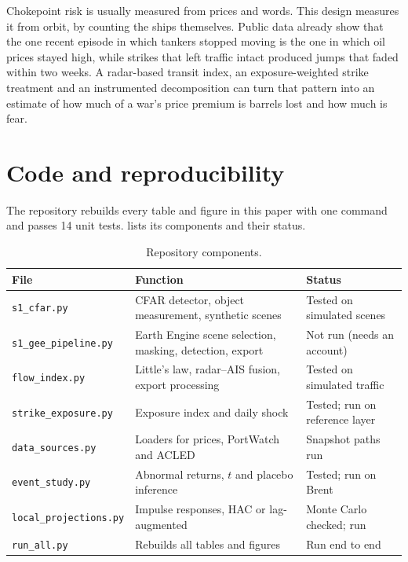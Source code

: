\documentclass{article}
\begin{document}
Chokepoint risk is usually measured from prices and words. This design measures it from orbit, by counting the ships themselves. Public data already show that the one recent episode in which tankers stopped moving is the one in which oil prices stayed high, while strikes that left traffic intact produced jumps that faded within two weeks. A radar-based transit index, an exposure-weighted strike treatment and an instrumented decomposition can turn that pattern into an estimate of how much of a war's price premium is barrels lost and how much is fear.

\FloatBarrier



\appendix
\section{Code and reproducibility}
\label{app:code}

The repository rebuilds every table and figure in this paper with one command and passes 14 unit tests.  lists its components and their status.

\begin{table}[h]
\centering
\small
\caption{Repository components.}
\label{tab:code}
\begin{tabularx}{\textwidth}{@{}L{4.1cm}YL{4.1cm}@{}}
\toprule
File & Function & Status \\
\midrule
\texttt{s1\_cfar.py} & CFAR detector, object measurement, synthetic scenes & Tested on simulated scenes \\
 \texttt{s1\_gee\_pipeline.py} & Earth Engine scene selection, masking, detection, export & Not run (needs an account) \\
\texttt{flow\_index.py} & Little's law, radar--AIS fusion, export processing & Tested on simulated traffic \\
 \texttt{strike\_exposure.py} & Exposure index and daily shock & Tested; run on reference layer \\
\texttt{data\_sources.py} & Loaders for prices, PortWatch and ACLED & Snapshot paths run \\
 \texttt{event\_study.py} & Abnormal returns, $t$ and placebo inference & Tested; run on Brent \\
\texttt{local\_projections.py} & Impulse responses, HAC or lag-augmented & Monte Carlo checked; run \\
 \texttt{run\_all.py} & Rebuilds all tables and figures & Run end to end \\
\bottomrule
\end{tabularx}
\end{table}
\end{document}
